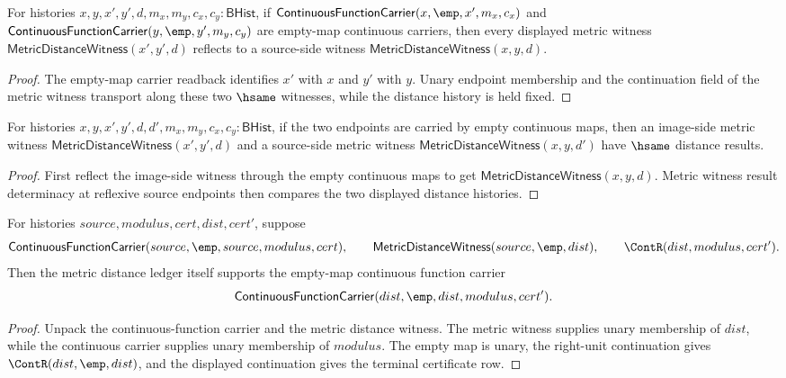 \begin{theorem}
\label{thm:continuousmap-empty-identity-metric-witness-reflects}
For histories $x,y,x',y',d,m_x,m_y,c_x,c_y:\mathsf{BHist}$, if
$\mathsf{ContinuousFunctionCarrier}(x,\emp,x',m_x,c_x)$ and
$\mathsf{ContinuousFunctionCarrier}(y,\emp,y',m_y,c_y)$ are empty-map
continuous carriers, then every displayed metric witness
$\mathsf{MetricDistanceWitness}(x',y',d)$ reflects to a source-side witness
$\mathsf{MetricDistanceWitness}(x,y,d)$.
\end{theorem}
\begin{proof}
The empty-map carrier readback identifies $x'$ with $x$ and $y'$ with $y$.
Unary endpoint membership and the continuation field of the metric witness
transport along these two $\hsame$ witnesses, while the distance history is
held fixed.
\end{proof}

\begin{theorem}
\label{thm:continuousmap-empty-identity-metric-result-deterministic}
For histories $x,y,x',y',d,d',m_x,m_y,c_x,c_y:\mathsf{BHist}$, if the two
endpoints are carried by empty continuous maps, then an image-side metric
witness $\mathsf{MetricDistanceWitness}(x',y',d)$ and a source-side metric
witness $\mathsf{MetricDistanceWitness}(x,y,d')$ have $\hsame$ distance
results.
\end{theorem}
\begin{proof}
First reflect the image-side witness through the empty continuous maps to get
$\mathsf{MetricDistanceWitness}(x,y,d)$. Metric witness result determinacy at
reflexive source endpoints then compares the two displayed distance histories.
\end{proof}

\begin{theorem}
\label{thm:continuousmap-empty-target-metric-rebased-carrier}
For histories $source,modulus,cert,dist,cert'$, suppose
$$
\mathsf{ContinuousFunctionCarrier}(source,\emp,source,modulus,cert),
\qquad
\mathsf{MetricDistanceWitness}(source,\emp,dist),
\qquad
\ContR(dist,modulus,cert').
$$
Then the metric distance ledger itself supports the empty-map continuous
function carrier
$$
\mathsf{ContinuousFunctionCarrier}(dist,\emp,dist,modulus,cert').
$$
\end{theorem}
\begin{proof}
Unpack the continuous-function carrier and the metric distance witness. The
metric witness supplies unary membership of $dist$, while the continuous
carrier supplies unary membership of $modulus$. The empty map is unary, the
right-unit continuation gives $\ContR(dist,\emp,dist)$, and the displayed
continuation gives the terminal certificate row.
\end{proof}

